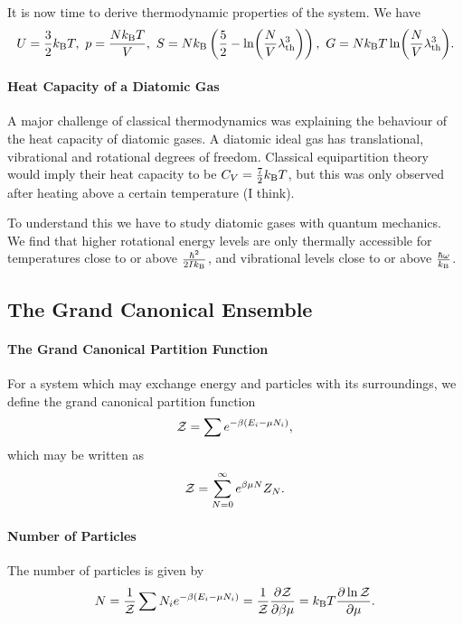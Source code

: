 It is now time to derive thermodynamic properties of the system. We have
\begin{align*}
U = \frac{3}{2}k_{\text{B}} T,\ p = \frac{Nk_{\text{B}} T}{V},\ S = Nk_{\text{B}}\left(\frac{5}{2} - \ln(\frac{N}{V}\lambda_{\text{th}}^{3})\right),\ G = Nk_{\text{B}} T\ln(\frac{N}{V}\lambda_{\text{th}}^{3}).
\end{align*}

\paragraph{Heat Capacity of a Diatomic Gas}
A major challenge of classical thermodynamics was explaining the behaviour of the heat capacity of diatomic gases. A diatomic ideal gas has translational, vibrational and rotational degrees of freedom. Classical equipartition theory would imply their heat capacity to be $C_{V} = \frac{7}{2}k_{\text{B}} T$, but this was only observed after heating above a certain temperature (I think).

To understand this we have to study diatomic gases with quantum mechanics. We find that higher rotational energy levels are only thermally accessible for temperatures close to or above $\frac{\hbar^{2}}{2Ik_{\text{B}}}$, and vibrational levels close to or above $\frac{\hbar\omega}{k_{\text{B}}}$.

\subsection{The Grand Canonical Ensemble}

\paragraph{The Grand Canonical Partition Function}
For a system which may exchange energy and particles with its surroundings, we define the grand canonical partition function
\begin{align*}
	\mathcal{Z} = \sum e^{-\beta(E_{i} - \mu N_{i})},
\end{align*}
which may be written as
\begin{align*}
	\mathcal{Z} = \sum\limits_{N = 0}^{\infty}e^{\beta\mu N}Z_{N}.
\end{align*}

\paragraph{Number of Particles}
The number of particles is given by
\begin{align*}
	N = \frac{1}{\mathcal{Z}}\sum N_{i}e^{-\beta(E_{i} - \mu N_{i})} = \frac{1}{\mathcal{Z}}\pdv{\mathcal{Z}}{\beta\mu} = k_{\text{B}} T\pdv{\ln{\mathcal{Z}}}{\mu}.
\end{align*}

